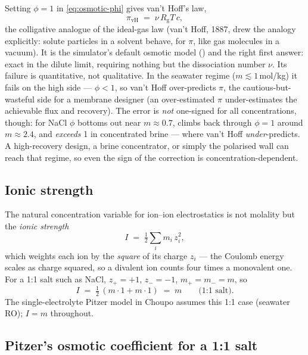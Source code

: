 \documentclass[11pt,a4paper]{article}
\newcommand{\Rgas}{R_{\!\mathrm{g}}}                %
\begin{document}
Setting $\phi = 1$ in \eqref{eq:osmotic-phi} gives van't Hoff's law,
\begin{equation}
   \pi_{\text{vH}} \;=\; \nu\,\Rgas T\, c,
   \label{eq:vant-hoff}
\end{equation}
the colligative analogue of the ideal-gas law (van't Hoff, 1887, drew
the analogy explicitly: solute particles in a solvent behave, for
$\pi$, like gas molecules in a vacuum).  It is the simulator's default
osmotic model () and the right first answer:
exact in the dilute limit, requiring nothing but the dissociation
number $\nu$.  Its failure is quantitative, not qualitative.  In the
seawater regime ($m \lesssim 1$\,mol/kg) it fails on the high side ---
$\phi < 1$, so van't Hoff over-predicts $\pi$, the cautious-but-wasteful
side for a membrane designer (an over-estimated $\pi$ under-estimates
the achievable flux and recovery).  The error is \emph{not} one-signed
for all concentrations, though: for NaCl $\phi$ bottoms out near
$m \approx 0.7$, climbs back through $\phi = 1$ around $m \approx 2.4$,
and \emph{exceeds} 1 in concentrated brine --- where van't Hoff
\emph{under}-predicts.  A high-recovery design, a brine concentrator,
or simply the polarised wall can reach that regime, so even the sign of
the correction is concentration-dependent.

\subsection{Ionic strength}

The natural concentration variable for ion--ion electrostatics is not
molality but the \emph{ionic strength}
\begin{equation}
   I \;=\; \tfrac12 \sum_i m_i\, z_i^{2},
   \label{eq:ionic-strength}
\end{equation}
which weights each ion by the \emph{square} of its charge $z_i$ ---
the Coulomb energy scales as charge squared, so a divalent ion counts
four times a monovalent one.  For a 1:1 salt such as NaCl,
$z_+ = +1$, $z_- = -1$, $m_+ = m_- = m$, so
\begin{equation}
   I \;=\; \tfrac12\,(m\cdot 1 + m\cdot 1) \;=\; m \qquad\text{(1:1 salt)}.
\end{equation}
The single-electrolyte Pitzer model in Choupo assumes this 1:1 case
(seawater RO); $I = m$ throughout.

\subsection{Pitzer's osmotic coefficient for a 1:1 salt}
\end{document}
